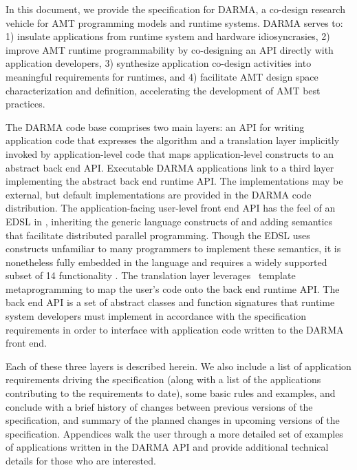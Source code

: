 
In this document, we provide the specification for \gls{DARMA}, 
a co-design research vehicle for \gls{AMT} \glspl{programming model} and
\glspl{runtime system}.  \gls{DARMA} serves to:
1) insulate applications from \gls{runtime system} and hardware idiosyncrasies,
2) improve \gls{AMT} runtime programmability by co-designing an \gls{API} directly with
  application developers, 3) synthesize application \gls{co-design} activities into
  meaningful requirements for runtimes, and 4) 
facilitate \gls{AMT} design space characterization and definition, accelerating the
development of \gls{AMT} best practices.

The \gls{DARMA} code base comprises two main layers: 
an \gls{API} for writing application code that expresses the algorithm and  
a translation layer implicitly invoked by application-level code that maps application-level constructs
to an abstract \gls{back end} \gls{API}.
Executable \gls{DARMA} applications link to a third layer implementing the
abstract \gls{back end} runtime \gls{API}.
The implementations may be external, but default implementations are provided
in the \gls{DARMA} code distribution.
The application-facing user-level \gls{front end} \gls{API} 
has the feel of an \gls{EDSL} in \CC,  inheriting the generic
language constructs of \CC and adding \gls{semantics} that facilitate
distributed parallel programming. Though the \gls{EDSL} uses
\CC constructs unfamiliar to many programmers to implement these semantics, 
it is nonetheless fully embedded in the \CC language and
requires a widely supported subset of \CC{}14 functionality \compilerReqs.
The \gls{translation layer} leverages \CC\ \gls{template
metaprogramming} to map the user's code onto the \gls{back end} runtime \gls{API}.
The \gls{back end} \gls{API} is a set of abstract classes and function
signatures that \gls{runtime system} developers must implement in accordance with the
specification requirements in order to interface with application code written
to the \gls{DARMA} front end.  

Each of these three layers is described herein. We also
include a list of application requirements driving the specification (along
with a list of the applications contributing to the requirements to date), some basic rules 
and examples, and conclude with a brief history of changes between previous
versions of the specification, and summary of the planned changes in upcoming
versions of the specification.  Appendices walk the user through a more detailed set
of examples of applications written in the \gls{DARMA} \gls{API} and provide
additional technical details for those who are interested.


